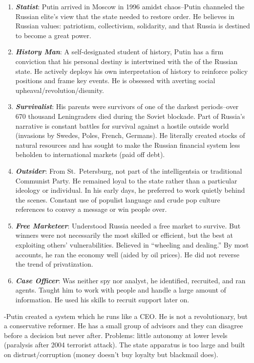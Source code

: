 \documentclass[
]{article}
\begin{document}
\begin{enumerate}
\def\labelenumi{\arabic{enumi}.}
\item
  \textbf{\emph{Statist}}: Putin arrived in Moscow in 1996 amidst
  chaos--Putin channeled the Russian elite's view that the state needed
  to restore order. He believes in Russian values: patriotism,
  collectivism, solidarity, and that Russia is destined to become a
  great power.
\item
  \textbf{\emph{History Man}}: A self-designated student of history,
  Putin has a firm conviction that his personal destiny is intertwined
  with the of the Russian state. He actively deploys his own
  interpretation of history to reinforce policy positions and frame key
  events. He is obsessed with averting social
  upheaval/revolution/disunity.
\item
  \textbf{\emph{Survivalist}}: His parents were survivors of one of the
  darkest periods--over 670 thousand Leningraders died during the Soviet
  blockade. Part of Russia's narrative is constant battles for survival
  against a hostile outside world (invasions by Swedes, Poles, French,
  Germans). He literally created stocks of natural resources and has
  sought to make the Russian financial system less beholden to
  international markets (paid off debt).
\item
  \textbf{\emph{Outsider}}: From St.~Petersburg, not part of the
  intelligentsia or traditional Communist Party. He remained loyal to
  the state rather than a particular ideology or individual. In his
  early days, he preferred to work quietly behind the scenes. Constant
  use of populist language and crude pop culture references to convey a
  message or win people over.
\item
  \textbf{\emph{Free Marketeer}}: Understood Russia needed a free market
  to survive. But winners were not necessarily the most skilled or
  efficient, but the best at exploiting others' vulnerabilities.
  Believed in ``wheeling and dealing.'' By most accounts, he ran the
  economy well (aided by oil prices). He did not reverse the trend of
  privatization.
\item
  \textbf{\emph{Case Officer}}: Was neither spy nor analyst, he
  identified, recruited, and ran agents. Taught him to work with people
  and handle a large amount of information. He used his skills to
  recruit support later on.
\end{enumerate}

-Putin created a system which he runs like a CEO. He is not a
revolutionary, but a conservative reformer. He has a small group of
advisors and they can disagree before a decision but never after.
Problems: little autonomy at lower levels (paralysis after 2004
terrorist attack). The state apparatus is too large and built on
distrust/corruption (money doesn't buy loyalty but blackmail does).
\end{document}
